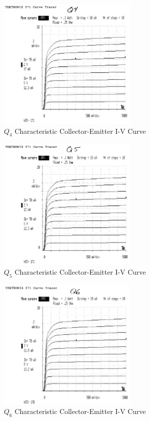 \documentclass[titlepage, letterpaper, 10.5pt]{article}
\begin{document}
\begin{figure}[ht]
	\centering
	\includegraphics[width=0.6\textwidth]{results/q4-characteristics}
	\caption{$Q_{4}$ Characteristic Collector-Emitter I-V Curve}
\end{figure}

\begin{figure}[ht]
	\centering
	\includegraphics[width=0.6\textwidth]{results/q5-characteristics}
	\caption{$Q_{5}$ Characteristic Collector-Emitter I-V Curve}
\end{figure}

\begin{figure}[ht]
	\centering
	\includegraphics[width=0.6\textwidth]{results/q6-characteristics}
	\caption{$Q_{6}$ Characteristic Collector-Emitter I-V Curve}
\end{figure}
\end{document}
